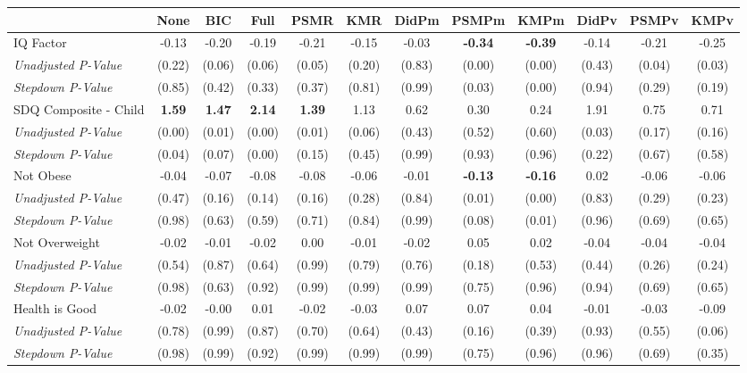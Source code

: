 \begin{tabular}{l c c c c c c c c c c c}
\toprule
 & None & BIC & Full & PSMR & KMR & DidPm & PSMPm & KMPm & DidPv & PSMPv & KMPv \\
\midrule
IQ Factor & -0.13 & -0.20 & -0.19 & -0.21 & -0.15 & -0.03 & \textbf{ -0.34 } & \textbf{ -0.39 } & -0.14 & -0.21 & -0.25 \\
\quad \textit{Unadjusted P-Value} & (0.22) & (0.06) & (0.06) & (0.05) & (0.20) & (0.83) & (0.00) & (0.00) & (0.43) & (0.04) & (0.03) \\
\quad \textit{Stepdown P-Value} & (0.85) & (0.42) & (0.33) & (0.37) & (0.81) & (0.99) & (0.03) & (0.00) & (0.94) & (0.29) & (0.19) \\
SDQ Composite - Child & \textbf{ 1.59 } & \textbf{ 1.47 } & \textbf{ 2.14 } & \textbf{ 1.39 } & 1.13 & 0.62 & 0.30 & 0.24 & 1.91 & 0.75 & 0.71 \\
\quad \textit{Unadjusted P-Value} & (0.00) & (0.01) & (0.00) & (0.01) & (0.06) & (0.43) & (0.52) & (0.60) & (0.03) & (0.17) & (0.16) \\
\quad \textit{Stepdown P-Value} & (0.04) & (0.07) & (0.00) & (0.15) & (0.45) & (0.99) & (0.93) & (0.96) & (0.22) & (0.67) & (0.58) \\
Not Obese & -0.04 & -0.07 & -0.08 & -0.08 & -0.06 & -0.01 & \textbf{ -0.13 } & \textbf{ -0.16 } & 0.02 & -0.06 & -0.06 \\
\quad \textit{Unadjusted P-Value} & (0.47) & (0.16) & (0.14) & (0.16) & (0.28) & (0.84) & (0.01) & (0.00) & (0.83) & (0.29) & (0.23) \\
\quad \textit{Stepdown P-Value} & (0.98) & (0.63) & (0.59) & (0.71) & (0.84) & (0.99) & (0.08) & (0.01) & (0.96) & (0.69) & (0.65) \\
Not Overweight & -0.02 & -0.01 & -0.02 & 0.00 & -0.01 & -0.02 & 0.05 & 0.02 & -0.04 & -0.04 & -0.04 \\
\quad \textit{Unadjusted P-Value} & (0.54) & (0.87) & (0.64) & (0.99) & (0.79) & (0.76) & (0.18) & (0.53) & (0.44) & (0.26) & (0.24) \\
\quad \textit{Stepdown P-Value} & (0.98) & (0.63) & (0.92) & (0.99) & (0.99) & (0.99) & (0.75) & (0.96) & (0.94) & (0.69) & (0.65) \\
Health is Good & -0.02 & -0.00 & 0.01 & -0.02 & -0.03 & 0.07 & 0.07 & 0.04 & -0.01 & -0.03 & -0.09 \\
\quad \textit{Unadjusted P-Value} & (0.78) & (0.99) & (0.87) & (0.70) & (0.64) & (0.43) & (0.16) & (0.39) & (0.93) & (0.55) & (0.06) \\
\quad \textit{Stepdown P-Value} & (0.98) & (0.99) & (0.92) & (0.99) & (0.99) & (0.99) & (0.75) & (0.96) & (0.96) & (0.69) & (0.35) \\

\end{tabular}
